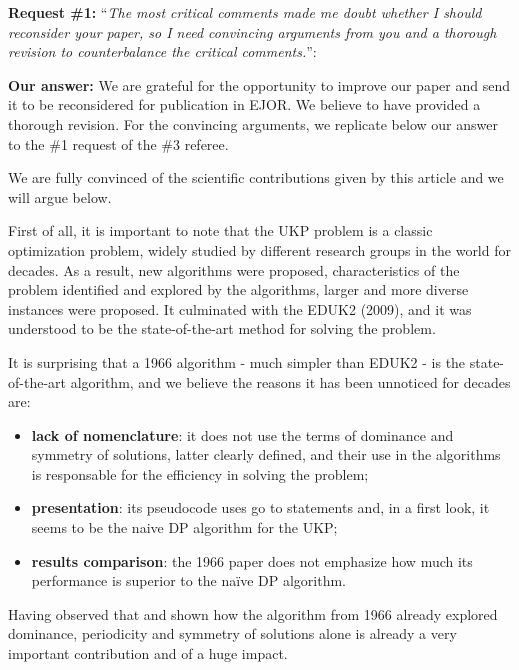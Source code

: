 \documentclass{elsarticle}
\begin{document}
\textbf{Request \#1:} ``\textit{The most critical comments made me doubt whether I should reconsider your paper, so I need convincing arguments from you and a thorough revision to counterbalance the critical comments.}'':

\textbf{Our answer:} We are grateful for the opportunity to improve our paper and send it to be reconsidered for publication in EJOR. We believe to have provided a thorough revision. For the convincing arguments, we replicate below our answer to the \#1 request of the \#3 referee.

We are fully convinced of the scientific contributions given by this article and we will argue below.

First of all, it is important to note that the UKP problem is a classic optimization problem,
widely studied by different research groups in the world for decades.
As a result, new algorithms were proposed, characteristics of the problem identified and explored by the algorithms, larger and more diverse instances were proposed.
It culminated with the EDUK2 (2009), and it was understood to be the state-of-the-art method for solving the problem.

It is surprising that a 1966 algorithm - much simpler than EDUK2 - is the state-of-the-art algorithm, and we believe the reasons it has been unnoticed for decades are:

\begin{itemize}

\item \textbf{lack of nomenclature}: it does not use the terms of dominance and symmetry of solutions, latter clearly defined, and their use in the algorithms is responsable for the efficiency in solving the problem;

\item \textbf{presentation}: its pseudocode uses go to statements and, in a first look, it seems to be the naive DP algorithm for the UKP;

\item \textbf{results comparison}: the 1966 paper does not emphasize how much its performance is superior to the naïve DP algorithm.

\end{itemize}

Having observed that and shown how the algorithm from 1966 already explored dominance, periodicity and symmetry of solutions alone is already a very important contribution and of a huge impact.
\end{document}

